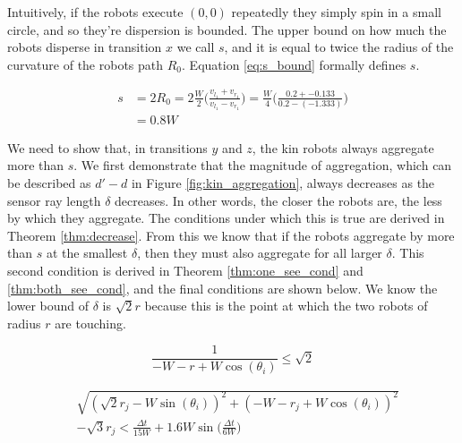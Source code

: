 \documentclass[conference]{IEEEtran}
\begin{document}
    Intuitively, if the robots execute $(0,0)$ repeatedly they simply spin in a small circle, and so they're dispersion is bounded. The upper bound on how much the robots disperse in transition $x$ we call $s$, and it is equal to twice the radius of the curvature of the robots path $R_0$. Equation \eqref{eq:s_bound} formally defines $s$.

    \begin{equation} \label{eq:s_bound}
      \begin{split}
        s &= 2R_0 = 2\frac{W}{2}\bigg(\frac{v_{l_1} + v_{r_1}}{v_{l_1} - v_{r_1}}\bigg) = \frac{W}{4}\bigg(\frac{0.2 + -0.133}{0.2 - (-1.333)}\bigg) \\
        &= 0.8W
      \end{split}
    \end{equation}

    We need to show that, in transitions $y$ and $z$, the kin robots always aggregate more than $s$. We first demonstrate that the magnitude of aggregation, which can be described as $d'-d$ in Figure \ref{fig:kin_aggregation}, always decreases as the sensor ray length $\delta$ decreases. In other words, the closer the robots are, the less by which they aggregate. The conditions under which this is true are derived in Theorem \ref{thm:decrease}. From this we know that if the robots aggregate by more than $s$ at the smallest $\delta$, then they must also aggregate for all larger $\delta$. This second condition is derived in Theorem \ref{thm:one_see_cond} and \ref{thm:both_see_cond}, and the final conditions are shown below. We know the lower bound of $\delta$ is $\sqrt{2}r$ because this is the point at which the two robots of radius $r$ are touching.

    \begin{equation} \label{eq:two_kin_cond_1}
        \frac{1}{-W-r+W\cos(\theta_i)} \leq \sqrt{2}
    \end{equation}

    \begin{equation} \label{eq:two_kin_cond_2}
      \begin{split}
        &\sqrt{(\sqrt{2}r_j - W\sin(\theta_i))^2 + (-W-r_j+W\cos(\theta_i))^2} \\
        & - \sqrt{3}r_j < \frac{\Delta t}{15W} + 1.6W\sin\bigg(\frac{\Delta t}{6W}\bigg)
      \end{split}
    \end{equation}
\end{document}

